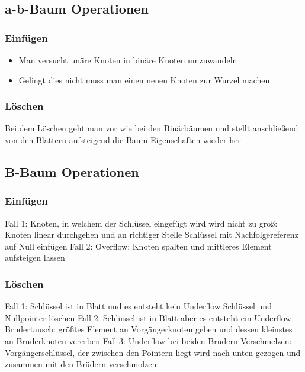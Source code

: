 \subsection{a-b-Baum Operationen}
\subsubsection{Einfügen}
	\begin{itemize}
	  \item Man versucht unäre Knoten in binäre Knoten umzuwandeln 
	  \item Gelingt dies nicht muss man einen neuen Knoten zur Wurzel machen
	\end{itemize}
\subsubsection{Löschen}
	Bei dem Löschen geht man vor wie bei den Binärbäumen und stellt anschließend von den Blättern aufsteigend die Baum-Eigenschaften wieder her
\subsection{B-Baum Operationen}
\subsubsection{Einfügen}
	Fall 1: Knoten, in welchem der Schlüssel eingefügt wird wird nicht zu groß: \newline \newline
	Knoten linear durchgehen und an richtiger Stelle Schlüssel mit Nachfolgereferenz auf Null einfügen \newline\newline
	Fall 2: Overflow: \newline \newline
	Knoten spalten und mittleres Element aufsteigen lassen
	\subsubsection{Löschen}
	Fall 1: Schlüssel ist in Blatt und es entsteht kein Underflow\newline \newline
	Schlüssel und Nullpointer löschen \newline \newline
	Fall 2: Schlüssel ist in Blatt aber es entsteht ein Underflow \newline \newline
	Brudertausch: größtes Element an Vorgängerknoten geben und dessen kleinstes an Bruderknoten vererben \newline \newline
	Fall 3: Underflow bei beiden Brüdern \newline \newline
	Verschmelzen: Vorgängerschlüssel, der zwischen den Pointern liegt wird nach unten gezogen und zusammen mit den Brüdern verschmolzen \newline \newline
